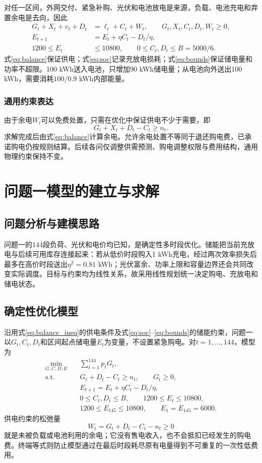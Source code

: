 \documentclass[UTF8,fontset=none,12pt,a4paper]{ctexart}
\begin{document}
对任一区间，外网交付、紧急补购、光伏和电池放电是来源，负载、电池充电和弃置余电是去向，因此
\begin{align}
 G_t+X_t+v_t+D_t&=\ell_t+C_t+W_t,\qquad G_t,X_t,C_t,D_t,W_t\ge0,\label{eq:balance}\\
 E_{t+1}&=E_t+\eta C_t-D_t/\eta,\label{eq:soc}\\
 1200\le E_t&\le10800,\qquad 0\le C_t,D_t\le B=5000/6.\label{eq:bounds}
\end{align}
式\eqref{eq:balance}保证供电；式\eqref{eq:soc}记录充放电损耗；式\eqref{eq:bounds}保证储电量和功率不超限。100 kWh送入电池，只增加90 kWh储电量；从电池向外送出100 kWh，需要消耗$100/0.9$ kWh内部能量。

\subsubsection{通用约束表达}
由于余电$W_t$可以免费处置，只需在优化中保证供电不少于需要，即
\begin{equation}
 G_t+X_t+D_t-C_t\ge n_t.
 \label{eq:balance_ineq}
\end{equation}
求解完成后由式\eqref{eq:balance}计算余电。允许余电处置不等同于退还购电费，已承诺购电仍按规则结算。后续各问仅调整供需预测、购电调整权限与费用结构，通用物理约束保持不变。

\section{问题一模型的建立与求解}
\subsection{问题分析与建模思路}
问题一的144段负荷、光伏和电价均已知，是确定性多时段优化。储能把当前充放电与后续可用库存连接起来：若从低价时段购入1 kWh充电，经过两次效率损失后最多在高价时段送出$\eta^2=0.81$ kWh；光伏富余、功率上限和容量边界还会共同改变实际调度。目标与约束均为线性关系，故采用线性规划统一决定购电、充放电和储电状态。

\subsection{确定性优化模型}
沿用式\eqref{eq:balance_ineq}的供电条件及式\eqref{eq:soc}--\eqref{eq:bounds}的储能约束，问题一以$G_t,C_t,D_t$和区间起点储电量$E_t$为变量，不设置紧急购电。对$t=1,\ldots,144$，模型为
\begin{align}
 \min_{G,C,D,E}\quad&\sum_{t=1}^{144}p_tG_t,\label{eq:q1obj}\\
 \text{s.t.}\quad&G_t+D_t-C_t\ge n_t,\qquad G_t\ge0,\nonumber\\
 &E_{t+1}=E_t+\eta C_t-D_t/\eta,\nonumber\\
 &0\le C_t,D_t\le B,\qquad 1200\le E_t\le10800,\nonumber\\
 &1200\le E_{145}\le10800,\qquad E_1=E_{145}=6000.\label{eq:q1end}
\end{align}
供电约束的松弛量
\[
 W_t=G_t+D_t-C_t-n_t\ge0
\]
就是未被负载或电池利用的余电；它没有售电收入，也不会抵扣已经发生的购电费。终端等式则防止模型通过在最后时段耗尽原有电量得到不可重复的一次性低费用。
\end{document}

